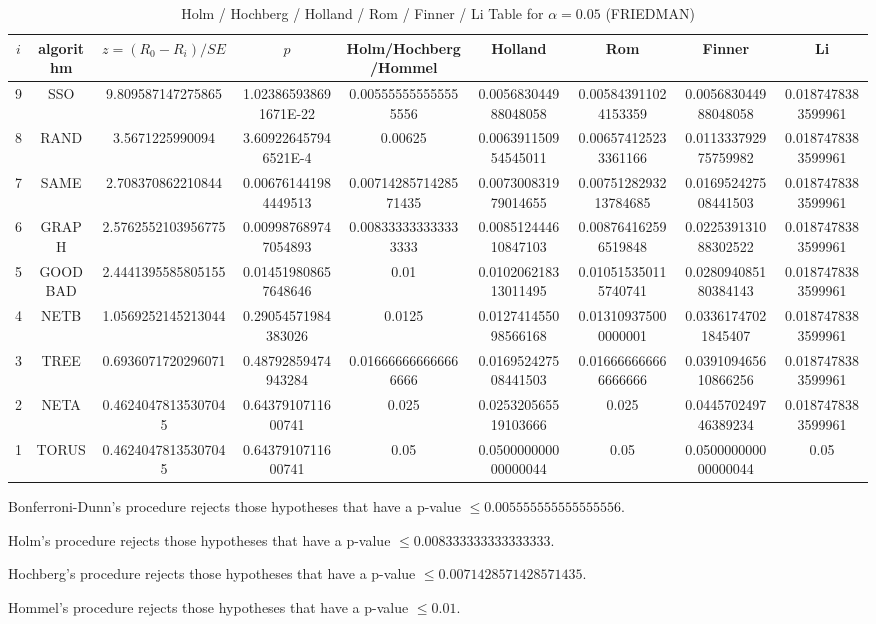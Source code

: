\documentclass[a4paper,10pt]{article}
\begin{document}
\begin{landscape}
\begin{table}[!htp]
\centering\scriptsize
\caption{Holm / Hochberg / Holland / Rom / Finner / Li Table for $\alpha=0.05$ (FRIEDMAN)}
\begin{tabular}{ccccccccc}
$i$&algorithm&$z=(R_0 - R_i)/SE$&$p$&Holm/Hochberg/Hommel&Holland&Rom&Finner&Li\\
\hline
9& SSO&9.809587147275865&1.023865938691671E-22&0.005555555555555556&0.005683044988048058&0.005843911024153359&0.005683044988048058&0.0187478383599961\\
8& RAND&3.5671225990094&3.609226457946521E-4&0.00625&0.006391150954545011&0.006574125233361166&0.011333792975759982&0.0187478383599961\\
7& SAME&2.708370862210844&0.006761441984449513&0.0071428571428571435&0.007300831979014655&0.0075128293213784685&0.016952427508441503&0.0187478383599961\\
6& GRAPH&2.5762552103956775&0.009987689747054893&0.008333333333333333&0.008512444610847103&0.008764162596519848&0.022539131088302522&0.0187478383599961\\
5& GOODBAD&2.4441395585805155&0.014519808657648646&0.01&0.010206218313011495&0.010515350115740741&0.028094085180384143&0.0187478383599961\\
4& NETB&1.0569252145213044&0.29054571984383026&0.0125&0.012741455098566168&0.013109375000000001&0.03361747021845407&0.0187478383599961\\
3& TREE&0.6936071720296071&0.48792859474943284&0.016666666666666666&0.016952427508441503&0.016666666666666666&0.039109465610866256&0.0187478383599961\\
2& NETA&0.46240478135307045&0.6437910711600741&0.025&0.025320565519103666&0.025&0.044570249746389234&0.0187478383599961\\
1& TORUS&0.46240478135307045&0.6437910711600741&0.05&0.050000000000000044&0.05&0.050000000000000044&0.05\\
\hline
\end{tabular}
\end{table}
Bonferroni-Dunn's procedure rejects those hypotheses that have a p-value $\le0.005555555555555556$.


Holm's procedure rejects those hypotheses that have a p-value $\le0.008333333333333333$.


Hochberg's procedure rejects those hypotheses that have a p-value $\le0.0071428571428571435$.


Hommel's procedure rejects those hypotheses that have a p-value $\le0.01$.



\end{landscape}
\end{document}
